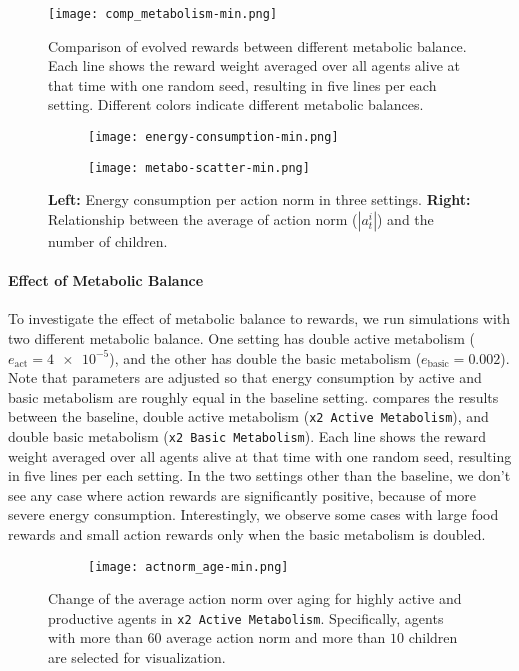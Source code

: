 \begin{figure}[!htb]
  \centering
  \texttt{[image: comp\_metabolism-min.png]}
  \caption{
    Comparison of evolved rewards between different metabolic balance.
    Each line shows the reward weight averaged over all agents alive at that time with one random seed, resulting in five lines per each setting.
    Different colors indicate different metabolic balances.
  }\label{figure:result-metabolism}
\end{figure}

\begin{figure}[t]
  \begin{subfigure}[t]{3cm}
    \centering
    \texttt{[image: energy-consumption-min.png]}
  \end{subfigure}
  \begin{subfigure}[t]{5cm}
    \centering
    \texttt{[image: metabo-scatter-min.png]}
  \end{subfigure}
  \caption{
    \textbf{Left:} Energy consumption per action norm in three settings.
    \textbf{Right:} Relationship between the average of action norm ($|a_{t}^{i}|$) and the number of children.
  }\label{figure:scatter-metabo}
\end{figure}

\paragraph{Effect of Metabolic Balance}
To investigate the effect of metabolic balance to rewards, we run simulations with two different metabolic balance. One setting has double active metabolism ($e_{\mathrm{act}} = \num{4e-5}$), and the other has double the basic metabolism ($e_{\mathrm{basic}} = 0.002$). Note that parameters are adjusted so that energy consumption by active and basic metabolism are roughly equal in the baseline setting.
 compares the results between the baseline, double active metabolism (\texttt{x2 Active Metabolism}), and double basic metabolism (\texttt{x2 Basic Metabolism}). Each line shows the reward weight averaged over all agents alive at that time with one random seed, resulting in five lines per each setting. In the two settings other than the baseline, we don't see any case where action rewards are significantly positive, because of more severe energy consumption.
Interestingly, we observe some cases with large food rewards and small action rewards only when the basic metabolism is doubled.

\begin{figure}[t]
  \begin{subfigure}[t]{7cm}
    \centering
    \texttt{[image: actnorm\_age-min.png]}
  \end{subfigure}
  \caption{Change of the average action norm over aging for highly active and productive agents in \texttt{x2 Active Metabolism}. Specifically, agents with more than $60$ average action norm and more than $10$ children are selected for visualization.}\label{figure:actnorm-age}
\end{figure}


